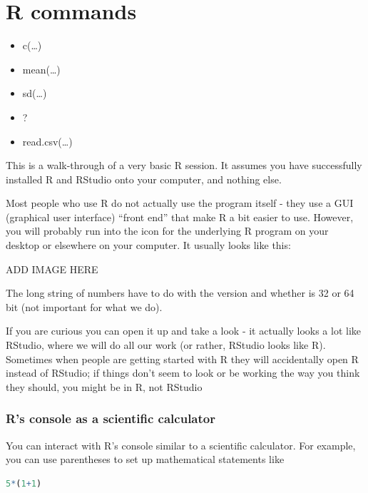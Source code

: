 \documentclass[
]{book}
\providecommand{\tightlist}{%
  \setlength{\itemsep}{0pt}\setlength{\parskip}{0pt}}
\begin{document}
\hypertarget{r-commands}{%
\section*{R commands}\label{r-commands}}

\begin{itemize}
\tightlist
\item
  c(\ldots)
\item
  mean(\ldots)
\item
  sd(\ldots)
\item
  ?
\item
  read.csv(\ldots)
\end{itemize}

This is a walk-through of a very basic R session. It assumes you have successfully installed R and RStudio onto your computer, and nothing else.

Most people who use R do not actually use the program itself - they use a GUI (graphical user interface) ``front end'' that make R a bit easier to use. However, you will probably run into the icon for the underlying R program on your desktop or elsewhere on your computer. It usually looks like this:

ADD IMAGE HERE

The long string of numbers have to do with the version and whether is 32 or 64 bit (not important for what we do).

If you are curious you can open it up and take a look - it actually looks a lot like RStudio, where we will do all our work (or rather, RStudio looks like R). Sometimes when people are getting started with R they will accidentally open R instead of RStudio; if things don't seem to look or be working the way you think they should, you might be in R, not RStudio

\hypertarget{rs-console-as-a-scientific-calculator}{%
\subsubsection{R's console as a scientific calculator}\label{rs-console-as-a-scientific-calculator}}

You can interact with R's console similar to a scientific calculator. For example, you can use parentheses to set up mathematical statements like

\begin{lstlisting}[language=R]
5*(1+1)
\end{lstlisting}
\end{document}
